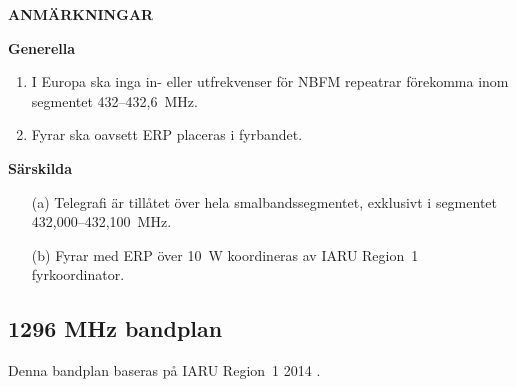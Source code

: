 \textbf{ANMÄRKNINGAR}

\textbf{Generella}

\begin{enumerate}[label=\alph*.]
\item I Europa ska inga in- eller utfrekvenser för NBFM repeatrar
förekomma inom segmentet 432--432,6~MHz.
\item Fyrar ska oavsett ERP placeras i fyrbandet.
\end{enumerate}

\textbf{Särskilda}

\begin{itemize}
\item[(a)] Telegrafi är tillåtet över hela smalbandssegmentet, exklusivt i
segmentet 432,000--432,100~MHz.
\item[(b)] Fyrar med ERP över 10~W koordineras av IARU Region~1 fyrkoordinator.
\end{itemize}

\subsection{1296 MHz bandplan}
\label{1296MHzbandplan}
Denna bandplan baseras på IARU Region~1 2014 \cite{IARU1}.

